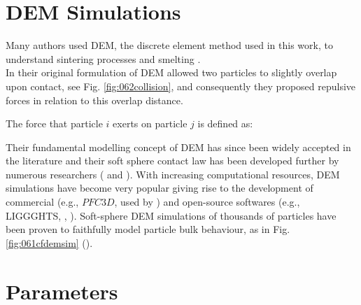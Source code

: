 \section{DEM Simulations}
\label{sec:demsimulations}

Many authors used \acs{DEM}, the discrete
element method used in this work, to understand sintering processes 
\cite{RefWorks:196, RefWorks:197} and smelting \cite{RefWorks:198,
RefWorks:199}.\\
In their original formulation of \acs{DEM} \citet{RefWorks:172} allowed two particles to slightly overlap upon
contact, see Fig. \ref{fig:062collision}, and consequently they proposed
repulsive forces in relation to this overlap distance.

The force that particle $i$ exerts on particle $j$ is defined as:

Their fundamental modelling concept of \acs{DEM} has
since been widely accepted in the literature and their soft sphere contact law has been developed further by
numerous researchers (\citet{RefWorks:148} and \citet{RefWorks:145}).
With increasing computational resources, \acs{DEM} simulations have become very
popular giving rise to the development of commercial (e.g., $PFC3D$, used by
\citet{RefWorks:87}) and open-source softwares (e.g.,
\acs{LIGGGHTS}, \citet{RefWorks:136}, \citet{RefWorks:139}).
Soft-sphere \acs{DEM} simulations of thousands of particles have been proven to 
faithfully model particle bulk behaviour, as in Fig. \ref{fig:061cfdemsim}
(\citet{RefWorks:86}).\\
 

\section{Parameters}
\label{sec:parameters}

